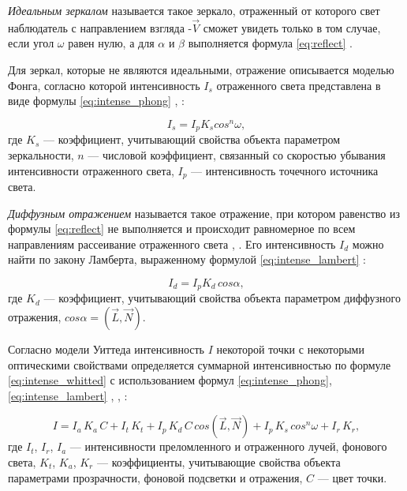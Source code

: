 \textit{Идеальным зеркалом} называется такое зеркало, отраженный от которого свет наблюдатель с направлением взгляда -$\overrightarrow V$ сможет увидеть только в том случае, если угол $\omega$ равен нулю, а для $\alpha$ и $\beta$ выполняется формула \ref{eq:reflect} \cite{демин2011}.

Для зеркал, которые не являются идеальными, отражение описывается моделью Фонга, согласно которой интенсивность $I_s$ отраженного света представлена в виде формулы \ref{eq:intense_phong} \cite{порев2002компьютерная}, \cite{демин2011}:

\begin{equation}\label{eq:intense_phong}
	I_s=I_p K_s cos^n{\omega},
\end{equation}
где $K_s$ --- коэффициент, учитывающий свойства объекта параметром зеркальности, $n$ --- числовой коэффициент, связанный со скоростью убывания интенсивности отраженного света, $I_p$ --- интенсивность точечного источника света.

\textit{Диффузным отражением} называется такое отражение, при котором равенство из формулы \ref{eq:reflect} не выполняется и происходит равномерное по всем направлениям рассеивание отраженного света \cite{порев2002компьютерная}, \cite{демин2011}.
Его интенсивность $I_d$ можно найти по закону Ламберта, выраженному формулой \ref{eq:intense_lambert} \cite{демин2011}:

\begin{equation}\label{eq:intense_lambert}
	I_d=I_p K_d \, cos{\alpha},
\end{equation}
где $K_d$ --- коэффициент, учитывающий свойства объекта параметром диффузного отражения, $cos{\alpha} = (\overrightarrow L, \overrightarrow N)$.

Согласно модели Уиттеда интенсивность $I$ некоторой точки  с некоторыми оптическими свойствами определяется суммарной интенсивностью по формуле \ref{eq:intense_whitted} с использованием формул \ref{eq:intense_phong}, \ref{eq:intense_lambert} \cite{порев2002компьютерная}, \cite{демин2011}, \cite{боресков}:

\begin{equation}\label{eq:intense_whitted}
	I = I_a \, K_a \, C + I_t \, K_t + I_p \, K_d \, C \, cos(\overrightarrow L, \overrightarrow N) + I_p \, K_s \, cos^n{\omega} + I_r \, K_r,
\end{equation}
где $I_t$, $I_r$, $I_a$ --- интенсивности преломленного и отраженного лучей, фонового света, $K_t$, $K_a$, $K_r$ --- коэффициенты, учитывающие свойства объекта параметрами прозрачности, фоновой подсветки и отражения, $C$ --- цвет точки.

